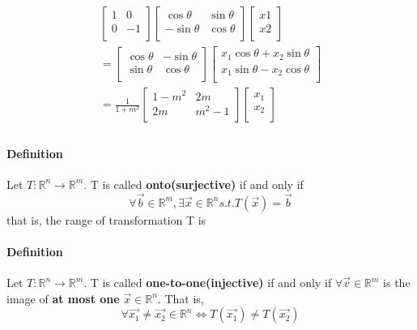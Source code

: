 \documentclass{article}
\begin{document}
\begin{multline}
		\begin{bmatrix}
			1 & 0 \\
			0 & -1 \\
		\end{bmatrix}
		\begin{bmatrix}
			\cos{\theta} & \sin{\theta} \\
			-\sin{\theta} & \cos{\theta}\\
		\end{bmatrix}
		\begin{bmatrix}
			x1 \\ x2\\
		\end{bmatrix} 
		\\
		= \begin{bmatrix}
			\cos{\theta} & - \sin{\theta} \\
			\sin{\theta} & \cos{\theta} \\
		\end{bmatrix}
		\begin{bmatrix}
			x_1 \cos{\theta} + x_2 \sin{\theta} \\
			x_1 \sin{\theta} - x_2 \cos{\theta} \\
		\end{bmatrix}
		\\
		= \frac{1}{1+m^2}
		\begin{bmatrix}
			1 - m^2 & 2 m \\
			2 m & m^2 -1 \\
		\end{bmatrix}
		\begin{bmatrix}
			x_1 \\ x_2 \\
		\end{bmatrix}
		\\
	\end{multline}
	\paragraph{Definition} Let $T:\mathbb{R}^n \rightarrow \mathbb{R}^m$. T is called \textbf{onto(surjective)} if and only if 
	\[
	\forall \vec{b} \in \mathbb{R}^m, \exists \vec{x} \in \mathbb{R}^n s.t. T(\vec{x}) = \vec{b}
	\]
	that is, the range of transformation T is 
	\paragraph{Definition} Let $T:\mathbb{R}^n \rightarrow \mathbb{R}^m$. T is called \textbf{one-to-one(injective)} if and only if $\forall \vec{v} \in \mathbb{R}^m$ is the image of \textbf{at most one} $\vec{x} \in \mathbb{R}^n$. That is,
	\[
	\forall \vec{x_1} \neq \vec{x_2} \in \mathbb{R}^n \iff T(\vec{x_1}) \neq T(\vec{x_2})
	\]
\end{document}
